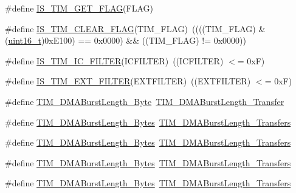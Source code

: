\begin{DoxyCompactItemize}
\item 
\#define \hyperlink{group___t_i_m___flags_ga6406de8131ae53ee29740c3e8627b098}{I\+S\+\_\+\+T\+I\+M\+\_\+\+G\+E\+T\+\_\+\+F\+L\+AG}(F\+L\+AG)
\item 
\#define \hyperlink{group___t_i_m___flags_gae60a1b5900de8354b2a4f017b2bd4f94}{I\+S\+\_\+\+T\+I\+M\+\_\+\+C\+L\+E\+A\+R\+\_\+\+F\+L\+AG}(T\+I\+M\+\_\+\+F\+L\+AG)~((((T\+I\+M\+\_\+\+F\+L\+AG) \& (\hyperlink{_p_e___types_8h_a1f1825b69244eb3ad2c7165ddc99c956}{uint16\+\_\+t})0x\+E100) == 0x0000) \&\& ((\+T\+I\+M\+\_\+\+F\+L\+A\+G) != 0x0000))
\item 
\#define \hyperlink{group___t_i_m___input___capture___filer___value_ga19ecc5fc2e1ce1697c3dbbb9809ca243}{I\+S\+\_\+\+T\+I\+M\+\_\+\+I\+C\+\_\+\+F\+I\+L\+T\+ER}(I\+C\+F\+I\+L\+T\+ER)~((I\+C\+F\+I\+L\+T\+ER) $<$= 0x\+F)
\item 
\#define \hyperlink{group___t_i_m___external___trigger___filter_ga500df0646edcf07316a55a652502ca87}{I\+S\+\_\+\+T\+I\+M\+\_\+\+E\+X\+T\+\_\+\+F\+I\+L\+T\+ER}(E\+X\+T\+F\+I\+L\+T\+ER)~((E\+X\+T\+F\+I\+L\+T\+ER) $<$= 0x\+F)
\item 
\#define \hyperlink{group___t_i_m___legacy_gad915c67fae262b887f4f074809448309}{T\+I\+M\+\_\+\+D\+M\+A\+Burst\+Length\+\_\+Byte}~\hyperlink{group___t_i_m___d_m_a___burst___length_gab87f91f1c5583b9888cb6bb37fc639e2}{T\+I\+M\+\_\+\+D\+M\+A\+Burst\+Length\+\_\+Transfer}
\item 
\#define \hyperlink{group___t_i_m___legacy_gabed2d89b663148923f4a7ca63d62d947}{T\+I\+M\+\_\+\+D\+M\+A\+Burst\+Length\+\_\+Bytes}~\hyperlink{group___t_i_m___d_m_a___burst___length_ga829504c3e8c90a9445f6a223bc3034f8}{T\+I\+M\+\_\+\+D\+M\+A\+Burst\+Length\+\_\+Transfers}
\item 
\#define \hyperlink{group___t_i_m___legacy_gad06dbc68a994da99b017a18a7197c0ad}{T\+I\+M\+\_\+\+D\+M\+A\+Burst\+Length\+\_\+Bytes}~\hyperlink{group___t_i_m___d_m_a___burst___length_ga3a99863a0925e0cc9a11b91aade66f11}{T\+I\+M\+\_\+\+D\+M\+A\+Burst\+Length\+\_\+Transfers}
\item 
\#define \hyperlink{group___t_i_m___legacy_ga620ce560a1d7a6d6769cacd2a2ead48d}{T\+I\+M\+\_\+\+D\+M\+A\+Burst\+Length\+\_\+Bytes}~\hyperlink{group___t_i_m___d_m_a___burst___length_ga84bfeb309593a1ac580e233bf7514b36}{T\+I\+M\+\_\+\+D\+M\+A\+Burst\+Length\+\_\+Transfers}
\item 
\#define \hyperlink{group___t_i_m___legacy_gaf9ac4a4cfd3dcfb7ba859898e702c881}{T\+I\+M\+\_\+\+D\+M\+A\+Burst\+Length\+\_\+Bytes}~\hyperlink{group___t_i_m___d_m_a___burst___length_ga44f8aa51fbe8887a5f3c37a0e776902c}{T\+I\+M\+\_\+\+D\+M\+A\+Burst\+Length\+\_\+Transfers}

\end{DoxyCompactItemize}
